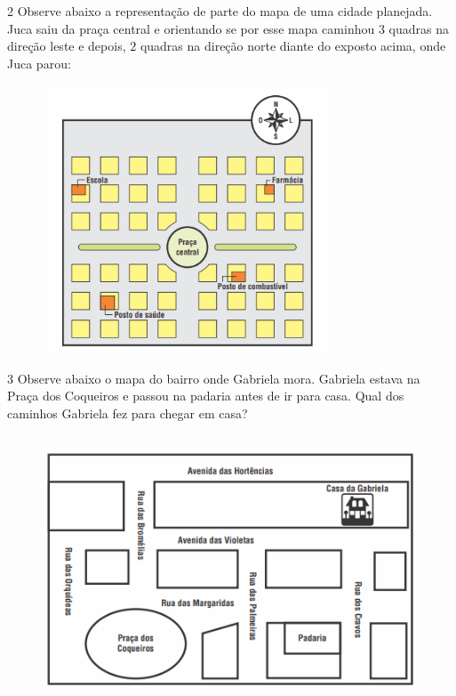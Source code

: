 {

\num{2}  Observe abaixo a representação de parte do mapa de uma cidade
planejada. Juca saiu da praça central e orientando se por esse mapa caminhou $3$
quadras na direção leste e depois, $2$ quadras na direção norte diante do
exposto acima, onde Juca parou:

\begin{figure}
\includegraphics[width=3.39535in,height=3.14326in]{./imgSAEB_6_MAT/media/image65.png}
\end{figure}


\num{3}  Observe abaixo o mapa do bairro onde Gabriela mora. Gabriela estava na Praça dos Coqueiros e passou na padaria antes de ir
para casa. Qual dos caminhos Gabriela fez para chegar em casa?

\begin{figure}
\includegraphics[width=4.95347in,height=3.13958in]{./imgSAEB_6_MAT/media/image66.png}
\end{figure}

}
